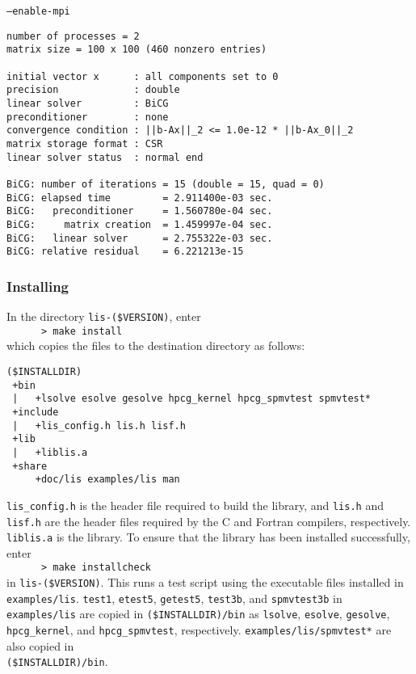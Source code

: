 \documentclass[a4paper]{article}
\begin{document}
\begin{itemsquarebox}[l]{\tt --enable-mpi}
 \begin{minipage}{10cm}
 \begin{verbatim}
number of processes = 2
matrix size = 100 x 100 (460 nonzero entries)

initial vector x      : all components set to 0
precision             : double
linear solver         : BiCG
preconditioner        : none
convergence condition : ||b-Ax||_2 <= 1.0e-12 * ||b-Ax_0||_2
matrix storage format : CSR
linear solver status  : normal end

BiCG: number of iterations = 15 (double = 15, quad = 0)
BiCG: elapsed time         = 2.911400e-03 sec.
BiCG:   preconditioner     = 1.560780e-04 sec. 
BiCG:     matrix creation  = 1.459997e-04 sec.
BiCG:   linear solver      = 2.755322e-03 sec.
BiCG: relative residual    = 6.221213e-15
 \end{verbatim}
 \end{minipage}
\end{itemsquarebox}

\subsubsection{Installing}
In the directory {\tt lis-(\$VERSION)}, enter\\
 \verb+      > make install+\\
which copies the files to the destination directory as follows:

\begin{verbatim}
($INSTALLDIR)
 +bin
 |   +lsolve esolve gesolve hpcg_kernel hpcg_spmvtest spmvtest*
 +include
 |   +lis_config.h lis.h lisf.h
 +lib
 |   +liblis.a
 +share
     +doc/lis examples/lis man
\end{verbatim}

{\tt lis\_config.h} is the header file required to build the library, and 
{\tt lis.h} and {\tt lisf.h} are the header files required 
by the C and Fortran compilers, respectively. 
{\tt liblis.a} is the library.
To ensure that the library has been installed successfully, enter\\
 \verb+      > make installcheck+\\
in {\tt lis-(\$VERSION)}.
This runs a test script using the executable files installed 
in {\tt examples/lis}. 
{\tt test1}, {\tt etest5}, {\tt getest5}, {\tt test3b}, and {\tt spmvtest3b} 
in {\tt examples/lis} 
are copied in {\tt (\$INSTALLDIR)/bin} as {\tt lsolve}, {\tt esolve}, 
{\tt gesolve}, {\tt hpcg\_kernel}, and {\tt hpcg\_spmvtest}, respectively.
{\tt examples/lis/spmvtest*} are also copied in \\
{\tt (\$INSTALLDIR)/bin}.
\end{document}
